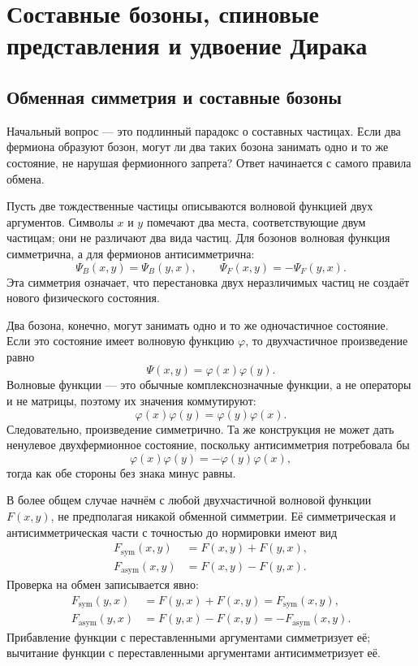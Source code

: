 \chapter{Составные бозоны, спиновые представления и удвоение Дирака}

\section{Обменная симметрия и составные бозоны}

Начальный вопрос — это подлинный парадокс о составных частицах. Если два фермиона образуют бозон, могут ли два таких бозона занимать одно и то же состояние, не нарушая фермионного запрета? Ответ начинается с самого правила обмена.

Пусть две тождественные частицы описываются волновой функцией двух аргументов. Символы \(x\) и \(y\) помечают два места, соответствующие двум частицам; они не различают два вида частиц. Для бозонов волновая функция симметрична, а для фермионов антисимметрична:
\begin{equation}
\Psi_B(x,y)=\Psi_B(y,x),
\qquad
\Psi_F(x,y)=-\Psi_F(y,x).
\end{equation}
Эта симметрия означает, что перестановка двух неразличимых частиц не создаёт нового физического состояния.

Два бозона, конечно, могут занимать одно и то же одночастичное состояние. Если это состояние имеет волновую функцию \(\varphi\), то двухчастичное произведение равно
\begin{equation}
\Psi(x,y)=\varphi(x)\varphi(y).
\end{equation}
Волновые функции — это обычные комплекснозначные функции, а не операторы и не матрицы, поэтому их значения коммутируют:
\begin{equation}
\varphi(x)\varphi(y)=\varphi(y)\varphi(x).
\end{equation}
Следовательно, произведение симметрично. Та же конструкция не может дать ненулевое двухфермионное состояние, поскольку антисимметрия потребовала бы
\begin{equation}
\varphi(x)\varphi(y)=-\varphi(y)\varphi(x),
\end{equation}
тогда как обе стороны без знака минус равны.

В более общем случае начнём с любой двухчастичной волновой функции \(F(x,y)\), не предполагая никакой обменной симметрии. Её симметрическая и антисимметрическая части с точностью до нормировки имеют вид
\begin{align}
F_{\mathrm{sym}}(x,y)&=F(x,y)+F(y,x),\\
F_{\mathrm{asym}}(x,y)&=F(x,y)-F(y,x).
\end{align}
Проверка на обмен записывается явно:
\begin{align}
F_{\mathrm{sym}}(y,x)
&=F(y,x)+F(x,y)
=F_{\mathrm{sym}}(x,y),\\
F_{\mathrm{asym}}(y,x)
&=F(y,x)-F(x,y)
=-F_{\mathrm{asym}}(x,y).
\end{align}
Прибавление функции с переставленными аргументами симметризует её; вычитание функции с переставленными аргументами антисимметризует её.

